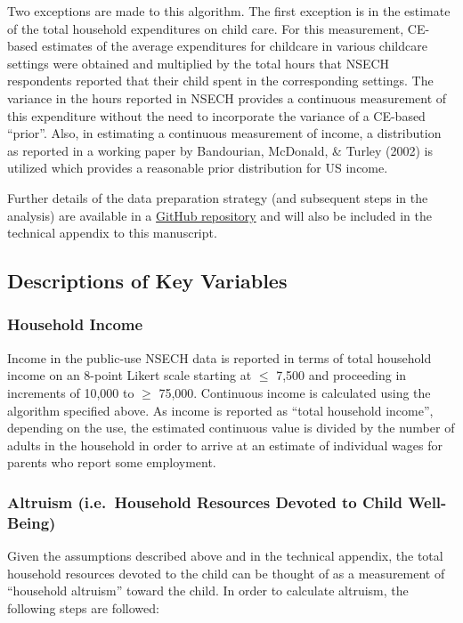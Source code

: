 \documentclass[review]{elsarticle}\usepackage[]{graphicx}\usepackage[]{color}
\begin{document}
Two exceptions are made to this algorithm. The first exception is in the
estimate of the total household expenditures on child care. For this
measurement, CE-based estimates of the average expenditures for
childcare in various childcare settings were obtained and multiplied by
the total hours that NSECH respondents reported that their child spent
in the corresponding settings. The variance in the hours reported in
NSECH provides a continuous measurement of this expenditure without the
need to incorporate the variance of a CE-based ``prior''. Also, in
estimating a continuous measurement of income, a distribution as
reported in a working paper by Bandourian, McDonald, \& Turley (2002) is
utilized which provides a reasonable prior distribution for US income.

Further details of the data preparation strategy (and subsequent steps
in the analysis) are available in a
\href{https://github.com/mienkoja/qualpaper}{GitHub repository} and will
also be included in the technical appendix to this manuscript.

\subsection{Descriptions of Key
Variables}\label{descriptions-of-key-variables}

\subsubsection{Household Income}\label{household-income}

Income in the public-use NSECH data is reported in terms of total
household income on an 8-point Likert scale starting at $\le$ 7,500 and
proceeding in increments of 10,000 to $\ge$ 75,000. Continuous income is
calculated using the algorithm specified above. As income is reported as
``total household income'', depending on the use, the estimated
continuous value is divided by the number of adults in the household in
order to arrive at an estimate of individual wages for parents who
report some employment.

\subsubsection{Altruism (i.e.~Household Resources Devoted to Child
Well-Being)}\label{altruism-i.e.household-resources-devoted-to-child-well-being}

Given the assumptions described above and in the technical appendix, the
total household resources devoted to the child can be thought of as a
measurement of ``household altruism'' toward the child. In order to
calculate altruism, the following steps are followed:
\end{document}
